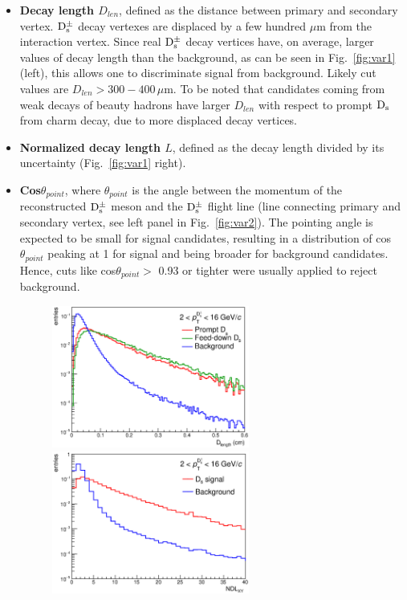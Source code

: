 \begin{itemize}
\item \textbf{Decay length $D_{len}$}, defined as the distance between
 primary and secondary vertex. ${\rm D_s^{\pm}}$ decay vertexes are displaced by
  a few hundred $\mu$m from the interaction vertex. Since real ${\rm D_s^{\pm}}$ 
  decay vertices have, on average, larger values of decay length than the
   background, as can be seen in Fig.~\ref{fig:var1} (left), 
   this allows one to discriminate signal from background. 
   Likely cut values are $D_{len} > 300-400\, \mu $m. 
   To be noted that candidates coming from weak decays of beauty hadrons have larger $D_{len}$
   with respect to prompt ${\rm D_s}$ from charm decay, due to more displaced decay vertices.
\item \textbf{Normalized decay length $L$}, defined as the decay length 
divided by its uncertainty (Fig.~\ref{fig:var1} right).
\item \textbf{Cos$\theta_{point}$}, where $\theta_{point}$ is the angle
 between the momentum of the reconstructed ${\rm D_s^{\pm}}$ meson and the 
 ${\rm D_s^{\pm}}$ flight line (line connecting primary and secondary vertex, see
  left panel in Fig.~\ref{fig:var2}). The pointing angle is expected to be small for signal 
  candidates, resulting in a distribution of cos$\theta_{point}$ peaking at 1 for 
  signal and being broader for background candidates. Hence, cuts like 
  cos$\theta_{point} >$ 0.93 or tighter were usually applied to reject background.
\begin{figure}[!t]
\centering
\includegraphics[width=6.5cm]{FigCap4/DL.eps}
\includegraphics[width=6.5cm]{FigCap4/NDLxy.eps}

\end{figure}
\end{itemize}
